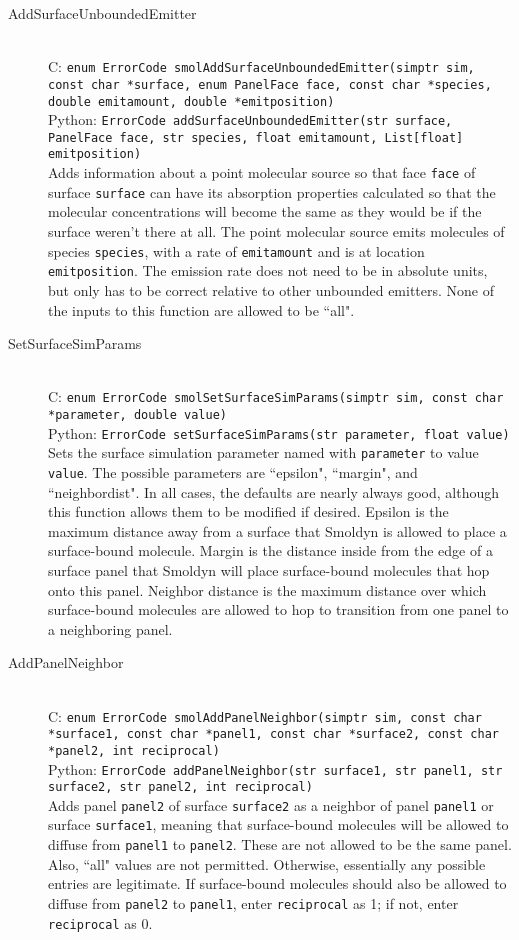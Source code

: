 \documentclass {book}
\newcommand {\ttt} {\texttt}
\begin{document}
\begin{description}
\item[AddSurfaceUnboundedEmitter]
\hfill \\
C: \ttt{enum ErrorCode smolAddSurfaceUnboundedEmitter(simptr sim, const char *surface, enum PanelFace face, const char *species, double emitamount, double *emitposition)}\\
Python: \ttt{ErrorCode addSurfaceUnboundedEmitter(str surface, PanelFace face, str species, float emitamount, List[float] emitposition)}\\
Adds information about a point molecular source so that face \ttt{face} of surface \ttt{surface} can have its absorption properties calculated so that the molecular concentrations will become the same as they would be if the surface weren't there at all. The point molecular source emits molecules of species \ttt{species}, with a rate of \ttt{emitamount} and is at location \ttt{emitposition}. The emission rate does not need to be in absolute units, but only has to be correct relative to other unbounded emitters. None of the inputs to this function are allowed to be ``all".

\item[SetSurfaceSimParams]
\hfill \\
C: \ttt{enum ErrorCode smolSetSurfaceSimParams(simptr sim, const char *parameter, double value)}\\
Python: \ttt{ErrorCode setSurfaceSimParams(str parameter, float value)}\\
Sets the surface simulation parameter named with \ttt{parameter} to value \ttt{value}. The possible parameters are ``epsilon", ``margin", and ``neighbordist". In all cases, the defaults are nearly always good, although this function allows them to be modified if desired. Epsilon is the maximum distance away from a surface that Smoldyn is allowed to place a surface-bound molecule. Margin is the distance inside from the edge of a surface panel that Smoldyn will place surface-bound molecules that hop onto this panel. Neighbor distance is the maximum distance over which surface-bound molecules are allowed to hop to transition from one panel to a neighboring panel.

\item[AddPanelNeighbor]
\hfill \\
C: \ttt{enum ErrorCode smolAddPanelNeighbor(simptr sim, const char *surface1, const char *panel1, const char *surface2, const char *panel2, int reciprocal)}\\
Python: \ttt{ErrorCode addPanelNeighbor(str surface1, str panel1, str surface2, str panel2, int reciprocal)}\\
Adds panel \ttt{panel2} of surface \ttt{surface2} as a neighbor of panel \ttt{panel1} or surface \ttt{surface1}, meaning that surface-bound molecules will be allowed to diffuse from \ttt{panel1} to \ttt{panel2}. These are not allowed to be the same panel. Also, ``all" values are not permitted. Otherwise, essentially any possible entries are legitimate. If surface-bound molecules should also be allowed to diffuse from \ttt{panel2} to \ttt{panel1}, enter \ttt{reciprocal} as 1; if not, enter \ttt{reciprocal} as 0.


\end{description}
\end{document}
